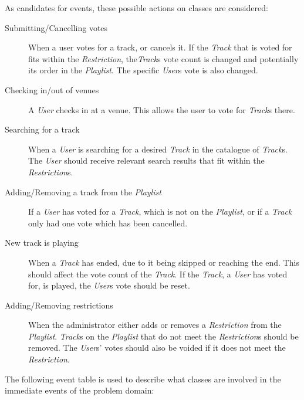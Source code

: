 As candidates for events, these possible actions on classes are considered:
\begin{description}
\item[Submitting/Cancelling votes]
    When a user votes for a track, or cancels it. If the \textit{Track} that is voted for fits within the \textit{Restriction}, the\textit{Track}s vote count is changed and potentially its order in the \textit{Playlist}. The specific \textit{User}s vote is also changed.
\item[Checking in/out of venues]
    A \textit{User} checks in at a venue. This allows the user to vote for \textit{Track}s there.
\item[Searching for a track]
    When a \textit{User} is searching for a desired \textit{Track} in the catalogue of \textit{Track}s. The \textit{User} should receive relevant search results that fit within the \textit{Restriction}s.
\item[Adding/Removing a track from the \textit{Playlist}]
    If a \textit{User} has voted for a \textit{Track}, which is not on the \textit{Playlist}, or if a \textit{Track} only had one vote which has been cancelled.
\item[New track is playing]
    When a \textit{Track} has ended, due to it being skipped or reaching the end. This should affect the vote count of the \textit{Track}. If the \textit{Track}, a \textit{User} has voted for, is played, the \textit{User}s vote should be reset.
\item[Adding/Removing restrictions]
    When the administrator either adds or removes a \textit{Restriction} from the \textit{Playlist}. \textit{Track}s on the \textit{Playlist} that do not meet the \textit{Restriction}s should be removed. The \textit{User}s' votes should also be voided if it does not meet the \textit{Restriction}.
\end{description}


The following event table is used to describe what classes are involved in the immediate events of the problem domain:

